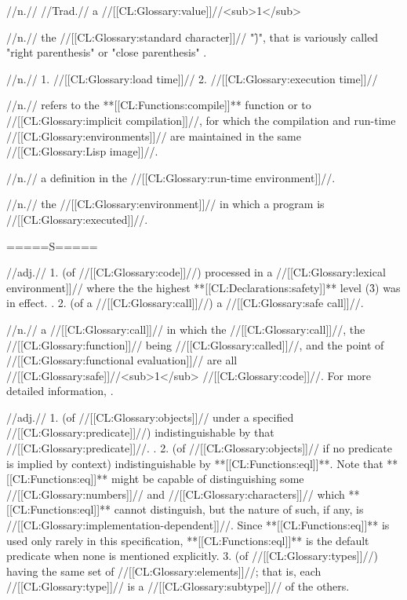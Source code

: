  //n.// //Trad.// a //[[CL:Glossary:value]]//<sub>1</sub>

 //n.// the //[[CL:Glossary:standard character]]// "\f{)}", that is variously called "right parenthesis" or "close parenthesis" \Seefigure\StdCharsThree.


 //n.// 1. //[[CL:Glossary:load time]]// 2. //[[CL:Glossary:execution time]]//

 //n.// refers to the **[[CL:Functions:compile]]** function or to //[[CL:Glossary:implicit compilation]]//, for which the compilation and run-time //[[CL:Glossary:environments]]// are maintained in the same //[[CL:Glossary:Lisp image]]//.

 //n.// a definition in the //[[CL:Glossary:run-time environment]]//.

 //n.// the //[[CL:Glossary:environment]]// in which a program is //[[CL:Glossary:executed]]//.

=====S=====
 
 //adj.// 1. (of //[[CL:Glossary:code]]//) processed in a //[[CL:Glossary:lexical environment]]// where the the highest **[[CL:Declarations:safety]]** level (\f{3}) was in effect. . 2. (of a //[[CL:Glossary:call]]//) a //[[CL:Glossary:safe call]]//.

 //n.// a //[[CL:Glossary:call]]// in which the //[[CL:Glossary:call]]//, the //[[CL:Glossary:function]]// being //[[CL:Glossary:called]]//, and the point of //[[CL:Glossary:functional evaluation]]// are all //[[CL:Glossary:safe]]//<sub>1</sub> //[[CL:Glossary:code]]//. For more detailed information, \seesection\SafeAndUnsafeCalls.

 //adj.// 1. (of //[[CL:Glossary:objects]]// under a specified //[[CL:Glossary:predicate]]//) indistinguishable by that //[[CL:Glossary:predicate]]//. . 2. (of //[[CL:Glossary:objects]]// if no predicate is implied by context) indistinguishable by **[[CL:Functions:eql]]**. Note that **[[CL:Functions:eq]]** might be capable of distinguishing some //[[CL:Glossary:numbers]]// and //[[CL:Glossary:characters]]// which **[[CL:Functions:eql]]** cannot distinguish, but the nature of such, if any, is //[[CL:Glossary:implementation-dependent]]//. Since **[[CL:Functions:eq]]** is used only rarely in this specification, **[[CL:Functions:eql]]** is the default predicate when none is mentioned explicitly.  3. (of //[[CL:Glossary:types]]//) having the same set of //[[CL:Glossary:elements]]//; that is, each //[[CL:Glossary:type]]// is a //[[CL:Glossary:subtype]]// of the others. 

